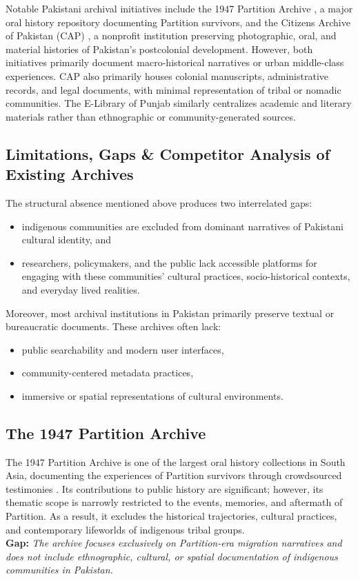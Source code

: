 Notable Pakistani archival initiatives include the 1947 Partition Archive \cite{partitionarchive}, a major oral history repository documenting Partition survivors, and the Citizens Archive of Pakistan (CAP) \cite{cap}, a nonprofit institution preserving photographic, oral, and material histories of Pakistan’s postcolonial development. However, both initiatives primarily document macro-historical narratives or urban middle-class experiences.
CAP also primarily houses colonial manuscripts, administrative records, and legal documents, with minimal representation of tribal or nomadic communities. The E-Library of Punjab \cite{punjablibrary} similarly centralizes academic and literary materials rather than ethnographic or community-generated sources.


\subsection{Limitations, Gaps \& Competitor Analysis of Existing Archives}

The structural absence mentioned above produces two interrelated gaps:
\begin{itemize}
    \item indigenous communities are excluded from dominant narratives of Pakistani cultural identity, and
    \item researchers, policymakers, and the public lack accessible platforms for engaging with these communities' cultural practices, socio-historical contexts, and everyday lived realities.
\end{itemize}

Moreover, most archival institutions in Pakistan primarily preserve textual or 
bureaucratic documents. These archives often lack:

\begin{itemize}
    \item public searchability and modern user interfaces,
    \item community-centered metadata practices,
    \item immersive or spatial representations of cultural environments.
\end{itemize}


\subsection*{The 1947 Partition Archive}
The 1947 Partition Archive is one of the largest oral history collections in South Asia, documenting the experiences of Partition survivors through crowdsourced testimonies \cite{partitionarchive}. Its contributions to public history are significant; however, its thematic scope is narrowly restricted to the events, memories, and aftermath of Partition. As a result, it excludes the historical trajectories, cultural practices, and contemporary lifeworlds of indigenous tribal groups.  
\\ \textbf{Gap:} \textit{The archive focuses exclusively on Partition-era migration narratives and does not include ethnographic, cultural, or spatial documentation of indigenous communities in Pakistan.}

